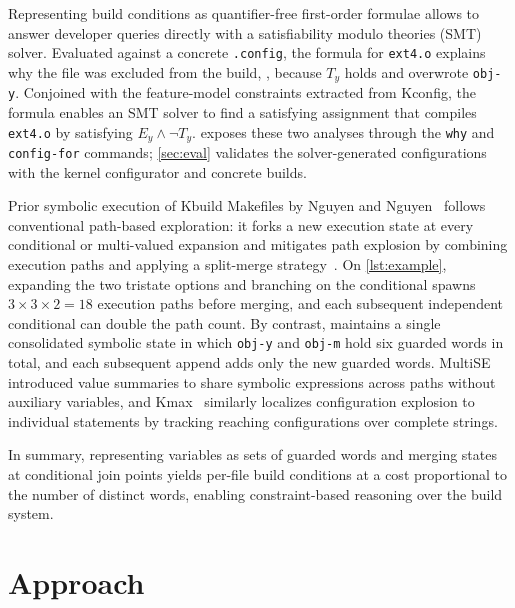 \documentclass[acmsmall,screen,review,anonymous,nonacm]{acmart}
\begin{document}
  Representing build conditions as quantifier-free first-order formulae allows \tool{} to answer developer queries directly with a satisfiability modulo theories (SMT) solver.
  Evaluated against a concrete \texttt{.config}, the formula for \texttt{ext4.o} explains why the file was excluded from the build, \eg, because $T_y$ holds and overwrote \texttt{obj-y}.
  Conjoined with the feature-model constraints extracted from Kconfig, the formula enables an SMT solver to find a satisfying assignment that compiles \texttt{ext4.o} by satisfying $E_y \land \neg T_y$.
  \tool{} exposes these two analyses through the \texttt{why} and \texttt{config-for} commands; \autoref{sec:eval} validates the solver-generated configurations with the kernel configurator and concrete builds.

  Prior symbolic execution of Kbuild Makefiles by Nguyen and Nguyen~\cite{nguyen2020kbuild} follows conventional path-based exploration: it forks a new execution state at every conditional or multi-valued expansion and mitigates path explosion by combining execution paths and applying a split-merge strategy~\cite{avgerinos2014enhancing,sen2015multise}.
  On \autoref{lst:example}, expanding the two tristate options and branching on the conditional spawns $3 \times 3 \times 2 = 18$ execution paths before merging, and each subsequent independent conditional can double the path count.
  By contrast, \tool{} maintains a single consolidated symbolic state in which \texttt{obj-y} and \texttt{obj-m} hold six guarded words in total, and each subsequent append adds only the new guarded words.
  MultiSE~\cite{sen2015multise} introduced value summaries to share symbolic expressions across paths without auxiliary variables, and Kmax~\cite{gazzillo2017kmax} similarly localizes configuration explosion to individual statements by tracking reaching configurations over complete strings.

  In summary, representing variables as sets of guarded words and merging states at conditional join points yields per-file build conditions at a cost proportional to the number of distinct words, enabling constraint-based reasoning over the build system.

\section{Approach}
  \label{sec:approach}
\end{document}

